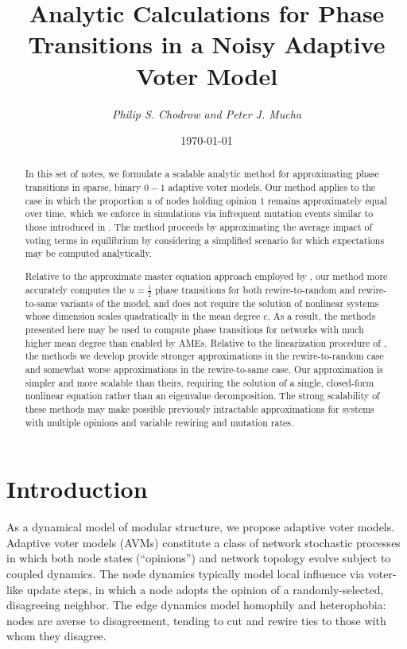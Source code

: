 \documentclass[english]{scrartcl}
\title{Analytic Calculations for Phase Transitions in a Noisy Adaptive Voter Model}
\author{\emph{Philip S. Chodrow and Peter J. Mucha}}
\date{\today}
\begin{document}

\maketitle
	\begin{abstract}
		In this set of notes, we formulate a scalable analytic method for approximating phase transitions in sparse, binary $0-1$ adaptive voter models. Our method applies to the case in which the proportion $u$ of nodes holding opinion $1$ remains approximately equal over time, which we enforce in simulations via infrequent mutation events similar to those introduced in \cite{Ji2013}. The method proceeds by approximating the average impact of voting terms in equilibrium by considering a simplified scenario for which expectations may be computed analytically. 

		Relative to the approximate master equation approach employed by \cite{Durrett2012}, our method more accurately computes the $u = \frac{1}{2}$ phase transitions for both rewire-to-random and rewire-to-same variants of the model, and does not require the solution of nonlinear systems whose dimension scales quadratically in the mean degree $c$. As a result, the methods presented here may be used to compute phase transitions for networks with much higher mean degree than enabled by AMEs. Relative to the linearization procedure of \cite{Bohme2011}, the methods we develop provide stronger approximations in the rewire-to-random case and somewhat worse approximations in the rewire-to-same case. Our approximation is simpler and more scalable than theirs, requiring the solution of a single, closed-form nonlinear equation rather than an eigenvalue decomposition. The strong scalability of these methods may make possible previously intractable approximations for systems with multiple opinions and variable rewiring and mutation rates. 
	\end{abstract}

\section{Introduction}

	

	As a dynamical model of modular structure, we propose adaptive voter models. Adaptive voter models (AVMs) constitute a class of network stochastic processes in which both node states (``opinions'') and network topology evolve subject to coupled dynamics. 
	The node dynamics typically model local influence via voter-like update steps, in which a node adopts the opinion of a randomly-selected, disagreeing neighbor. 
	The edge dynamics model homophily and heterophobia: nodes are averse to disagreement, tending to cut and rewire ties to those with whom they disagree. 
\end{document}
